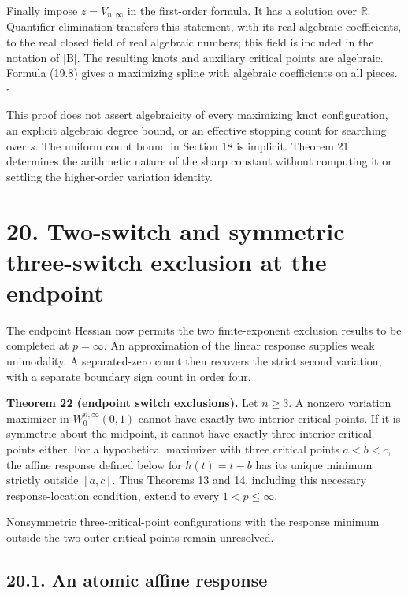 \documentclass[11pt]{article}
\begin{document}
Finally impose \(z=V_{n,\infty}\) in the first-order formula. It has a
solution over \(\mathbb R\). Quantifier elimination transfers this
statement, with its real algebraic coefficients, to the real closed
field of real algebraic numbers; this field is included in the notation
of {[}B{]}. The resulting knots and auxiliary critical points are
algebraic. Formula (19.8) gives a maximizing spline with algebraic
coefficients on all pieces. \(\square\)

This proof does not assert algebraicity of every maximizing knot
configuration, an explicit algebraic degree bound, or an effective
stopping count for searching over \(s\). The uniform count bound in
Section 18 is implicit. Theorem 21 determines the arithmetic nature of
the sharp constant without computing it or settling the higher-order
variation identity.

\section{20. Two-switch and symmetric three-switch exclusion at the
endpoint}\label{two-switch-and-symmetric-three-switch-exclusion-at-the-endpoint}

The endpoint Hessian now permits the two finite-exponent exclusion
results to be completed at \(p=\infty\). An approximation of the linear
response supplies weak unimodality. A separated-zero count then recovers
the strict second variation, with a separate boundary sign count in
order four.

\textbf{Theorem 22 (endpoint switch exclusions).} Let \(n\ge3\). A
nonzero variation maximizer in \(W_0^{n,\infty}(0,1)\) cannot have
exactly two interior critical points. If it is symmetric about the
midpoint, it cannot have exactly three interior critical points either.
For a hypothetical maximizer with three critical points \(a<b<c\), the
affine response defined below for \(h(t)=t-b\) has its unique minimum
strictly outside \([a,c]\). Thus Theorems 13 and 14, including this
necessary response-location condition, extend to every \(1<p\le\infty\).

Nonsymmetric three-critical-point configurations with the response
minimum outside the two outer critical points remain unresolved.

\subsection{20.1. An atomic affine
response}\label{an-atomic-affine-response}
\end{document}
